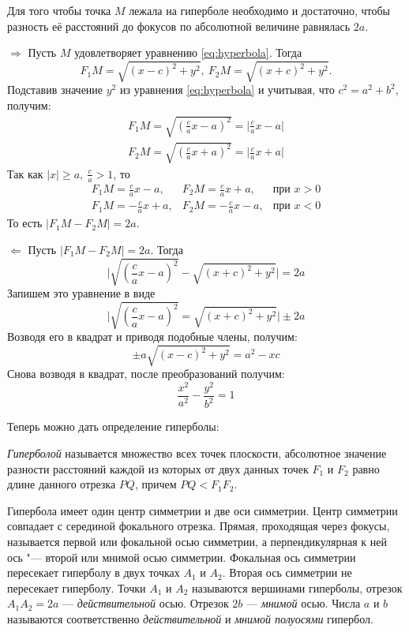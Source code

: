 \begin{theorem}
  Для того чтобы точка $M$ лежала на гиперболе необходимо и достаточно, чтобы разность её расстояний до фокусов по абсолютной величине равнялась $2a$.
\end{theorem}
\begin{Proof}
  $\Rightarrow$ Пусть $M$ удовлетворяет уравнению \ref{eq:hyperbola}. Тогда
    $$
    F_1M = \sqrt{(x - c)^2 + y^2}, ~ F_2M = \sqrt{(x + c)^2 + y^2}.
    $$
    Подставив значение $y^2$ из уравнения \ref{eq:hyperbola} и учитывая, что $c^2 = a^2 + b^2$, получим:
    \begin{gather*}
      F_1M = \sqrt{(\frac{c}{a}x - a)^2} = \mathopen|\frac{c}{a}x - a \mathclose| \\
      F_2M = \sqrt{(\frac{c}{a}x + a)^2} = \mathopen|\frac{c}{a}x + a \mathclose|
    \end{gather*}
    Так как $\mathopen|x\mathclose| \geq a, ~ \frac{c}{a} > 1$, то 
    $$
    \begin{array}{ccc}
      F_1M = \frac{c}{a}x - a, & F_2M = \frac{c}{a}x + a, & \text{при }x > 0 \\
      F_1M = -\frac{c}{a}x + a, & F_2M = -\frac{c}{a}x - a, & \text{при }x < 0 
    \end{array}
    $$
    То есть $\mathopen|F_1M - F_2M\mathclose| = 2a$.

  $\Leftarrow$ Пусть $\mathopen|F_1M - F_2M\mathclose| = 2a$. Тогда
  $$
    \mathopen| \sqrt{(\frac{c}{a}x - a)^2} - \sqrt{(x + c)^2 + y^2} \mathclose| = 2a
  $$
  Запишем это уравнение в виде 
  $$
  \mathopen| \sqrt{(\frac{c}{a}x - a)^2} = \sqrt{(x + c)^2 + y^2} \mathclose| \pm 2a
  $$
  Возводя его в квадрат и приводя подобные члены, получим:
  $$
    \pm a \sqrt{(x - c)^2 + y^2} = a^2 - xc
  $$
  Снова возводя в квадрат, после преобразований получим:
  $$
    \frac{x^2}{a^2} - \frac{y^2}{b^2} = 1
  $$
\end{Proof}
Теперь можно дать определение гиперболы:
\begin{definition}
  \textit{Гиперболой} называется множество всех точек плоскости, абсолютное значение разности расстояний каждой из которых от двух данных точек $F_1$ и $F_2$ равно длине данного отрезка $PQ$, причем $PQ < F_1F_2$.
\end{definition}


Гипербола имеет один центр симметрии и две оси симметрии. Центр симметрии совпадает с серединой фокального отрезка. Прямая, проходящая через фокусы, называется первой или фокальной осью симметрии, а перпендикулярная к ней ось "--- второй или мнимой осью симметрии. Фокальная ось
симметрии пересекает гиперболу в двух точках $A_1$ и $A_2$. Вторая ось симметрии не пересекает гиперболу. Точки $A_1$ и $A_2$ называются вершинами гиперболы, отрезок
$A_1A_2 = 2a$ — \textit{действительной} осью. Отрезок $2b$ — \textit{мнимой} осью. Числа $a$ и $b$
называются соответственно \textit{действительной} и \textit{мнимой полуосями} гипербол.

